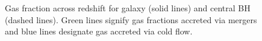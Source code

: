 \documentclass[manuscript]{aastex}
\begin{document}
\begin{figure}
\centerline{}
\caption[]{Gas fraction across redshift for galaxy (solid lines) and central BH (dashed lines). Green lines signify gas fractions accreted via mergers and blue lines designate gas accreted via cold flow.}
\label{h277numfrac} 
\end{figure}
\end{document}
